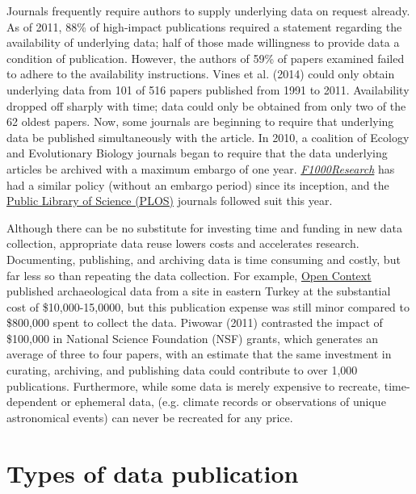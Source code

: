 \documentclass[10pt,twocolumn]{article}
\begin{document}
Journals frequently require authors to supply underlying data on request already.
As of 2011, 88\% of high-impact publications required a statement regarding the availability of underlying data; half of those made willingness to provide data a condition of publication\cite{alsheikh-ali_public_2011}.
However, the authors of 59\% of papers examined failed to adhere to the availability instructions.
Vines et al. (2014)\cite{vines_availability_2014} could only obtain underlying data from 101 of 516 papers published from 1991 to 2011.
Availability dropped off sharply with time; data could only be obtained from only two of the 62 oldest papers.
Now, some journals are beginning to require that underlying data be published simultaneously with the article.
In 2010, a coalition of Ecology and Evolutionary Biology journals began to require that the data underlying articles be archived with a maximum embargo of one year\cite{whitlock_data_2010, fairbairn_advent_2010}.
\href{http://f1000research.com}{\emph{F1000Research}} has had a similar policy (without an embargo period) since its inception, and the {\href{http://www.plos.org/}{Public Library of Science (PLOS)}} journals followed suit this year\cite{bloom_data_2014}.

Although there can be no substitute for investing time and funding in new data collection, appropriate data reuse lowers costs and accelerates research.
Documenting, publishing, and archiving data is time consuming and costly, but far less so than repeating the data collection.
For example, \href{http://opencontext.org/}{Open Context} published archaeological data from a site in eastern Turkey at the substantial cost of \$10,000-15,0000, but this publication expense was still minor compared to \$800,000 spent to collect the data\cite{kansa_we_2014}.
Piwowar (2011) contrasted the impact of \$100,000 in National Science Foundation (NSF) grants, which generates an average of three to four papers, with an estimate that the same investment in curating, archiving, and publishing data could contribute to over 1,000 publications\cite{piwowar_data_2011}.
Furthermore, while some data is merely expensive to recreate, time-dependent or ephemeral data, (e.g. climate records or observations of unique astronomical events) can never be recreated for any price\cite{gray_online_2002}.

\section*{Types of data publication}\label{types-of-data-publication}
\end{document}
